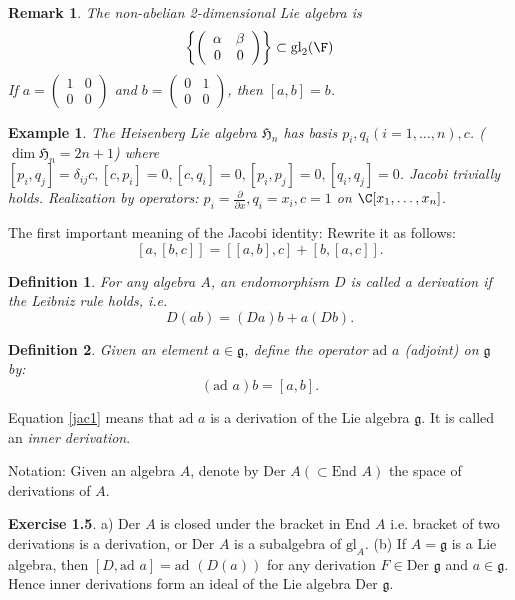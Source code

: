 \documentclass[11pt]{article}
\newcommand{\gl}{\mbox{gl}}
\newcommand{\Der}{\mbox{Der\ }}
\newcommand{\End}{\mbox{End\ }}
\newcommand{\ad}{\mbox{ad\ }}
\newcommand{\g}{\mathfrak{g}}
\newcommand{\He}{\mathfrak{H}}
\newcommand{\sk}{\vspace*{1em}}
\newtheorem{defn}{Definition}
\newtheorem{remark}{Remark}
\newtheorem{example}{Example}
\begin{document}
\begin{remark}
The non-abelian 2-dimensional Lie algebra is 
\[ \left\{ \left( \begin{array}{cc} \alpha & \beta \\ 0 & 0 \end{array} \right) \right\} \subset \gl_2(\F) \]
If $a = \left( \begin{array}{cc} 1 & 0 \\ 0 & 0 \end{array} \right)$ and
$b = \left( \begin{array}{cc} 0 & 1 \\ 0 & 0 \end{array} \right)$, then
$[a,b] = b$.
\end{remark}

\begin{example}
The Heisenberg Lie algebra $\He_n$ has basis $p_i, q_i (i = 1, \ldots, n), c$.
($\dim \He_n = 2n+1$) where $[p_i, q_j] = \delta_{ij} c, [c, p_i] = 0, 
[c, q_i] = 0, [p_i, p_j] = 0, [q_i, q_j] = 0$.  Jacobi trivially holds.
Realization by operators: $p_i = \frac{\partial}{\partial x},
q_i = x_i, c = 1$ on $\C[x_1, \ldots, x_n]$.
\end{example}

The first important meaning of the Jacobi identity: Rewrite it as follows:
\begin{equation}
\label{jac1}
[a, [b, c]] = [[a, b], c] + [b, [a, c]]. 
\end{equation}

\begin{defn}
For any algebra $A$, an endomorphism $D$ is called a \emph{derivation}
if the Leibniz rule holds, \emph{i.e.} 
\[D(ab) = (Da)b + a(Db).\]
\end{defn}

\begin{defn}
Given an element $a \in \g$, define the operator $\ad a$ (adjoint) on $\g$
by: 
\[ (\ad a) b = [a, b]. \]
\end{defn}
Equation \ref{jac1} means that $\ad a$ is a derivation of the Lie algebra $\g$.
It is called an \emph{inner derivation}.

Notation: Given an algebra $A$, denote by $\Der A (\subset \End A)$
the space of derivations of $A$.

\sk\noindent
{\bf Exercise 1.5}. a) $\Der A$ is closed under the bracket in $\End A$ i.e.
bracket of two derivations is a derivation, or $\Der A$ is a
subalgebra of $\gl_A$. (b) If $A = \g$ is a Lie
algebra, then $[D, \ad a] = \ad(D(a))$ for any derivation
$F \in \Der \g$ and $a \in \g$.  Hence
inner derivations form an ideal of the Lie algebra $\Der \g$.
\end{document}
